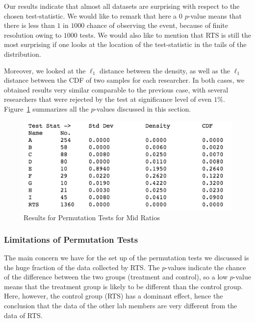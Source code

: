 \documentclass{article}
\begin{document}
Our results indicate that almost all datasets are surprising with respect to the chosen
test-statistic. 
We would like to remark that here a $0$ $p$-value means that there is less than $1$ in $1000$ chance of observing the event, because of finite resolution owing to $1000$ tests. 
We would also like to mention that RTS is still the most surprising if one looks at the location of the test-statistic in the
tails of the distribution.

Moreover, we looked at the \(\ell_1\) distance between the density, as well as the
\(\ell_1\) distance between the CDF of two samples for each researcher.
In both cases, we obtained results very similar comparable to the previous case, with several
researchers that were rejected by the test at significance level of even
\(1 \%\). 
Figure~\ref{mid_ratio_perm} summarizes all the $p$-values discussed in this section.

\begin{figure}[htbp]
\centering
\includegraphics[width=0.8\linewidth]{images/mid_ratio_perm.png}
\caption{Results for Permutation Tests for Mid Ratios}
\label{mid_ratio_perm}
\end{figure}

\subsubsection{Limitations of Permutation Tests} %
\label{ssub:limitations_of_permutation_test}

The main concern we have for the set up of the permutation tests we discussed is the huge fraction of the data
collected by RTS. 
The $p$-values indicate the chance of the difference
between the two groups (treatment and control), so a low $p$-value means
that the treatment group is likely to be different than the control
group. 
Here, however, the control group (RTS) has a dominant effect, hence the conclusion that the data of the
other lab members are very different from the data of RTS. 
\end{document}
